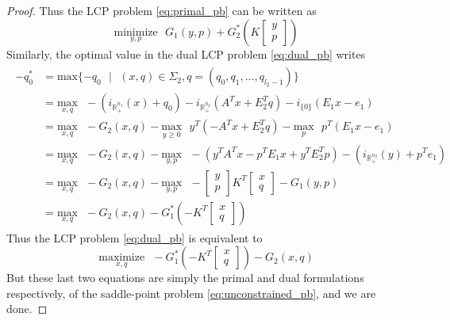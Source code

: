 \documentclass[12pt]{article}
\begin{document}
\begin{proof}
Thus the LCP problem \eqref{eq:primal_pb} can be written as 
\begin{equation}
  \underset{y,p}{\text{minimize}}\text{ }G_1(y,p) + G_2^*\left(K\begin{bmatrix}y\\p\end{bmatrix}\right)
\end{equation}
Similarly, the optimal value in the dual LCP problem \eqref{eq:dual_pb} writes
\begin{eqnarray*}
  \begin{aligned}
 -q_0^* &= \text{max}\{-q_0\text{ }|\text{ } (x, q) \in \Sigma_2, q = (q_0, q_1, ..., q_{l_2-1})\}\\
    &= \underset{x,q}{\text{max}}\text{ }-(i_{\mathbb{R}^{n_1}_+}(x) + q_0) - i_{\mathbb{R}^{n_2}_+}(A^Tx+E_2^Tq) - i_{\{0\}}(E_1x - e_1)\\
    &= \underset{x,q}{\text{max}}\text{ }-G_2(x, q) - \underset{y \geq 0}{\text{max}}\text{ }y^T(-A^Tx + E_2^Tq) - \underset{p}{\text{max}}\text{ }p^T(E_1x-e_1)\\
    &= \underset{x,q}{\text{max}}\text{ }-G_2(x, q) -\underset{y,p}{\text{max}}\text{ }-(y^TA^Tx -p^TE_1x + y^TE_2^Tp)-(i_{\mathbb{R}^{n_2}_+}(y) + p^Te_1)\\
    &= \underset{x,q}{\text{max}}\text{ }-G_2(x, q)-\underset{y,p}{\text{max}}\text{ }-
 \begin{bmatrix}y\\p\end{bmatrix}K^T\begin{bmatrix}x\\q\end{bmatrix}-G_1(y,p)\\
   &= \underset{x,q}{\text{max}}\text{ }-G_2(x, q)-G_1^*\left(-K^T\begin{bmatrix}x\\q\end{bmatrix}\right)
  \end{aligned}
\end{eqnarray*}
Thus the LCP problem \eqref{eq:dual_pb} is equivalent to
\begin{equation}
  \underset{x,q}{\text{maximize}}\text{ }-G_1^*\left(-K^T\begin{bmatrix}x\\q\end{bmatrix}\right) - G_2(x, q)
\end{equation}
But these last two equations are simply the primal and dual formulations respectively, of the saddle-point problem \eqref{eq:unconstrained_pb}, and we are done.


\end{proof}
\end{document}
